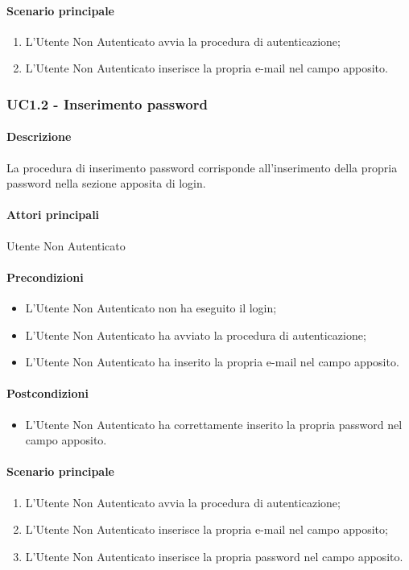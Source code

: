 \paragraph*{Scenario principale}
\begin{enumerate}
  \item L’Utente Non Autenticato avvia la procedura di autenticazione;
  \item L’Utente Non Autenticato inserisce la propria e-mail nel campo apposito.  
\end{enumerate}


\subsubsection{UC1.2 - Inserimento password}\label{UC1point2}
\paragraph*{Descrizione}
La procedura di inserimento password corrisponde all’inserimento della propria password nella sezione apposita di login.

\paragraph*{Attori principali} Utente Non Autenticato

\paragraph*{Precondizioni}
\begin{itemize}
  \item L’Utente Non Autenticato non ha eseguito il login;
  \item L’Utente Non Autenticato ha avviato la procedura di autenticazione;
  \item L’Utente Non Autenticato ha inserito la propria e-mail nel campo apposito.
\end{itemize}

\paragraph*{Postcondizioni}
\begin{itemize}
  \item L’Utente Non Autenticato ha correttamente inserito la propria password nel campo apposito.
\end{itemize}

\paragraph*{Scenario principale}
\begin{enumerate}
  \item L’Utente Non Autenticato avvia la procedura di autenticazione;
  \item L’Utente Non Autenticato inserisce la propria e-mail nel campo apposito;
  \item L’Utente Non Autenticato inserisce la propria password nel campo apposito.  
\end{enumerate}


